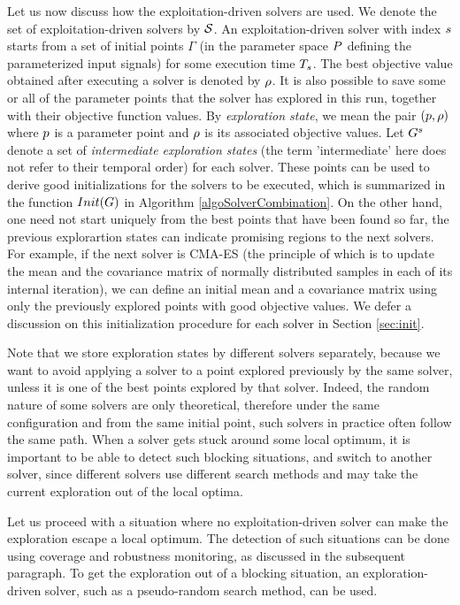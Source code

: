Let us now discuss how the exploitation-driven solvers are used. We denote the set of exploitation-driven solvers by $\mathcal{S}$. An exploitation-driven solver with index $s$ starts from a set of initial points $\Gamma$ (in the parameter space $P$ defining the parameterized input signals) for some execution time $T_{s}$. The best objective value obtained after executing a solver is denoted by $\rho$. It is also possible to save some or all of the parameter points that the solver has explored in this run, together with their objective function values. By {\em exploration state}, we mean the pair $(p, \rho)$ where $p$ is a parameter point and $\rho$ is its associated objective values. Let $G^{s}$ denote a set of {\em intermediate exploration states} (the term 'intermediate' here does not refer to their temporal order) for each solver. These points can be used to derive good initializations for the solvers to be executed, which is summarized in the function $Init(G)$ in Algorithm \ref{algoSolverCombination}. On the other hand, one need not start uniquely from the best points that have been found so far, the previous explorartion states can indicate promising regions to the next solvers. For example, if the next solver is CMA-ES (the principle of which is to update the mean and the covariance matrix of normally distributed samples in each of its internal iteration), we can define an initial mean and a covariance matrix using only the previously explored points with good objective values. We defer a discussion on this initialization procedure for each solver in Section \ref{sec:init}. 

Note that we store exploration states by different solvers separately, because we want to avoid applying a solver to a point explored previously by the same solver, unless it is one of the best points explored by that solver. Indeed, the random nature of some solvers are only theoretical, therefore under the same configuration and from the same initial point, such solvers in practice often follow the same path. When a solver gets stuck around some local optimum, it is important to be able to detect such blocking situations, and switch to another solver, since different solvers use different search methods and may take the current exploration out of the local optima. 

Let us proceed with a situation where no exploitation-driven solver can make the exploration escape a local optimum. The detection of such situations can be done using coverage and robustness monitoring, as discussed in the subsequent paragraph. To get  the exploration out of a blocking situation, an exploration-driven solver, such as a pseudo-random search method, can be used.  

